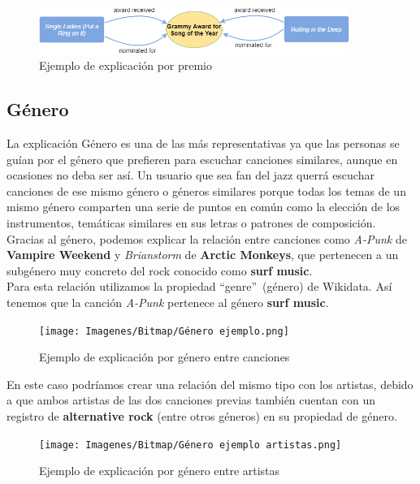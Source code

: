 \begin{figure}[h!]
	\centering
	\includegraphics[width = 0.9\textwidth]{Imagenes/Bitmap/Premio ejemplo.png}
	\caption{Ejemplo de explicación por premio}
	\label{fig:sampleImage}
\end{figure}

\subsection*{Género}

La explicación Género es una de las más representativas ya que las personas se guían por el género que prefieren para escuchar canciones similares, aunque en ocasiones no deba ser así. Un usuario que sea fan del jazz querrá escuchar canciones de ese mismo género o géneros similares porque todas los temas de un mismo género comparten una serie de puntos en común como la elección de los instrumentos, temáticas similares en sus letras o patrones de composición.\\

Gracias al género, podemos explicar la relación entre canciones como \textit{A-Punk} de \textbf{Vampire Weekend} y \textit{Brianstorm} de \textbf{Arctic Monkeys}, que pertenecen a un subgénero muy concreto del rock conocido como \textbf{surf music}.\\

Para esta relación utilizamos la propiedad ``genre''~(género) de Wikidata. Así tenemos que la canción \textit{A-Punk} pertenece al género \textbf{surf music}.\\

\begin{figure}[h!]
	\centering
	\texttt{[image: Imagenes/Bitmap/Género ejemplo.png]}
	\caption{Ejemplo de explicación por género entre canciones}
	\label{fig:sampleImage}
\end{figure}

En este caso podríamos crear una relación del mismo tipo con los artistas, debido a que ambos artistas de las dos canciones previas también cuentan con un registro de \textbf{alternative rock} (entre otros géneros) en su propiedad de género.\\

\begin{figure}[h!]
	\centering
	\texttt{[image: Imagenes/Bitmap/Género ejemplo artistas.png]}
	\caption{Ejemplo de explicación por género entre artistas}
	\label{fig:sampleImage}
\end{figure}


